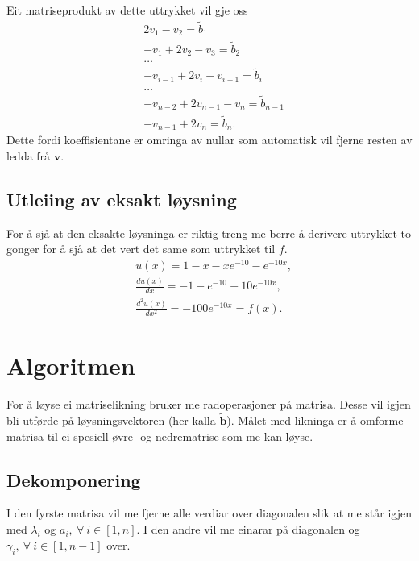 \documentclass[11pt, a4paper]{article}
\begin{document}
  Eit matriseprodukt av dette uttrykket vil gje oss
  \begin{equation*}
    \begin{align}
      &2v_1 - v_2 = \tilde{b}_1 \\
      &-v_1 + 2v_2 - v_3 = \tilde{b}_2 \\
      &\dots \\
      &-v_{i-1} + 2v_i - v_{i+1} = \tilde{b}_i \\
      &\dots \\
      &-v_{n-2} + 2v_{n-1} -v_{n} = \tilde{b}_{n-1} \\
      &-v_{n-1} + 2v_{n} = \tilde{b}_n.
    \end{align}
  \end{equation*}
  Dette fordi koeffisientane er omringa av nullar som automatisk vil fjerne resten av ledda frå 
  $\mathbf{v}$.

  \subsection{Utleiing av eksakt løysning}
    For å sjå at den eksakte løysninga er riktig treng me berre å derivere uttrykket to gonger for å
    sjå at det vert det same som uttrykket til $f$.
    \begin{equation*}
      \begin{align}
        &u(x) = 1 - x - xe^{-10} - e^{-10x}, \\
        &\frac{du(x)}{dx} = -1 -e^{-10} + 10e^{-10x}, \\
        &\frac{d^2u(x)}{dx^2} = -100e^{-10x} = f(x).
      \end{align}
    \end{equation*}

\section{Algoritmen}
  For å løyse ei matriselikning bruker me radoperasjoner på matrisa. Desse vil igjen bli utførde på
  løysningsvektoren (her kalla $\mathbf{\tilde{b}}$). Målet med likninga er å omforme matrisa til ei 
  spesiell øvre-  og nedrematrise som me kan løyse. 
  
  \subsection{Dekomponering}
    I den fyrste matrisa vil me fjerne alle verdiar over diagonalen slik at me står igjen med $\lambda_i$ og $a_i, \ \forall \ i \in [1, n]$. I den andre vil me einarar på diagonalen og $\gamma_i, \ \forall \ i \in [1, n - 1]$ over.
\end{document}
